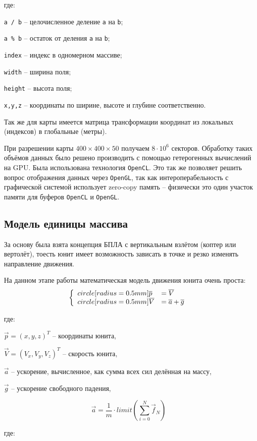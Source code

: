 где:

\verb|a / b| -- целочисленное деление \verb|a| на \verb|b|;

\verb|a % b| -- остаток от деления \verb|a| на \verb|b|;

\verb|index| -- индекс в одномерном массиве;

\verb|width| -- ширина поля;

\verb|height| -- высота поля;

\verb|x,y,z| -- координаты по ширине, высоте и глубине соответственно.

Так же для карты имеется матрица трансформации координат из локальных (индексов)
в глобальные (метры).

При разрешении карты $400 \times 400 \times 50$ получаем $8 \cdot 10^6$ секторов.
Обработку таких объёмов данных было решено производить с помощью гетерогенных 
вычислений на GPU. Была использована технология \verb|OpenCL|. Это так же 
позволяет решить вопрос отображения данных через \verb|OpenGL|, так как
интероперабельность с графической системой использует zero-copy память -- 
физически это один участок памяти для буферов \verb|OpenCL| и \verb|OpenGL|.

\newpage
\subsection{Модель единицы массива}

За основу была взята концепция БПЛА с вертикальным взлётом (коптер или вертолёт),
тоесть юнит имеет возможность зависать в точке и резко изменять направление движения.

На данном этапе работы математическая модель движения юнита очень проста:
$$
\left\{
    \begin{array}{l l}
    \dot{\vec{p}}  & = \vec V \\
    \dot{\vec{V}}  & = \vec a + \vec g
    \end{array}
\right.
$$

где:

$\vec p = (x,y,z)^T$ -- координаты юнита,

$\vec V = (V_x,V_y,V_z)^T$ -- скорость юнита,

$\vec a$ -- ускорение, вычисленное, как сумма всех сил делённая на массу,

$\vec g$ -- ускорение свободного падения,

$$ \vec a = \frac{1}{m} \cdot limit \left( \sum_{i=0}^N \vec f_N \right) $$

где:

